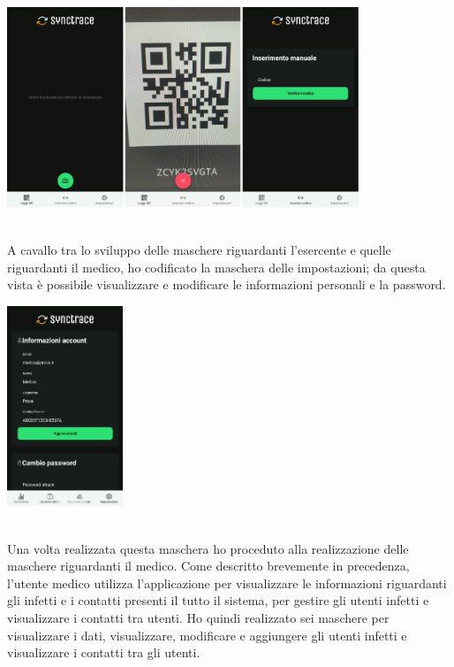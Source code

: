\begin{minipage}{\linewidth}
  \centering
    \includegraphics[height=6cm]{immagini/app/es}
\end{minipage}\\

A cavallo tra lo sviluppo delle maschere riguardanti l'esercente e quelle riguardanti il medico, ho codificato la maschera delle impostazioni; da questa vista è possibile visualizzare e modificare le informazioni personali e la password. \\

\begin{minipage}{\linewidth}
  \centering
    \includegraphics[height=6cm]{immagini/app/settings}
\end{minipage}\\

Una volta realizzata questa maschera ho proceduto alla realizzazione delle maschere riguardanti il medico. Come descritto brevemente in precedenza, l'utente medico utilizza l'applicazione per visualizzare le informazioni riguardanti gli infetti e i contatti presenti il tutto il sistema, per gestire gli utenti infetti e visualizzare i contatti tra utenti. Ho quindi realizzato sei maschere per visualizzare i dati, visualizzare, modificare e aggiungere gli utenti infetti e visualizzare i contatti tra gli utenti. \\

